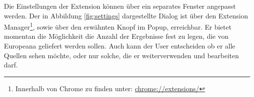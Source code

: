  Die Einstellungen der Extension können über ein separates Fenster angepasst werden. Der in Abbildung \ref{fig:settings} dargestellte Dialog ist über den Extension Manager\footnote{Innerhalb von Chrome zu finden unter: \url{chrome://extensions/}}, sowie über den erwähnten Knopf im Popup, erreichbar. Er bietet momentan die Möglichkeit die Anzahl der Ergebnisse fest zu legen, die von Europeana geliefert werden sollen. Auch kann der User entscheiden ob er alle Quellen sehen möchte, oder nur solche, die er weiterverwenden und bearbeiten darf.